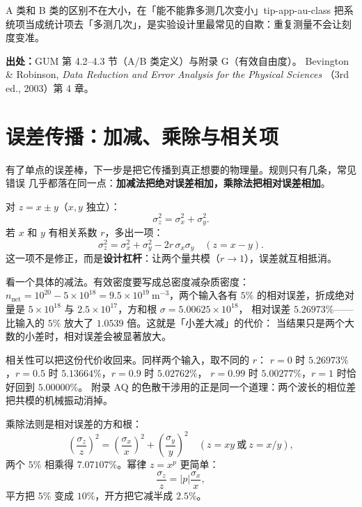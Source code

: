 \begin{tip}{A 类和 B 类的区别不在大小，在「能不能靠多测几次变小」}{tip-app-au-class}
把系统项当成统计项去「多测几次」，是实验设计里最常见的自欺：重复测量不会让刻度变准。
\end{tip}

{\small

\textbf{出处：}GUM 第 4.2--4.3 节（A/B 类定义）与附录 G（有效自由度）。
Bevington \& Robinson, \emph{Data Reduction and Error Analysis for the Physical Sciences}
（3rd ed., 2003）第 4 章。
}

\section{误差传播：加减、乘除与相关项}
\label{sec:app-au-propagate}

有了单点的误差棒，下一步是把它传播到真正想要的物理量。规则只有几条，常见错误
几乎都落在同一点：\textbf{加减法把绝对误差相加，乘除法把相对误差相加}。

对 $z=x\pm y$（$x,y$ 独立）：
\begin{equation}
\sigma_z^2=\sigma_x^2+\sigma_y^2 .
\label{eq:app-au-sum}
\end{equation}
若 $x$ 和 $y$ 有相关系数 $r$，多出一项：
\begin{equation}
\sigma_z^2=\sigma_x^2+\sigma_y^2-2r\,\sigma_x\sigma_y \quad (z=x-y).
\label{eq:app-au-corr}
\end{equation}
这一项不是修正，而是\textbf{设计杠杆}：让两个量共模（$r\to1$），误差就互相抵消。

看一个具体的减法。有效密度要写成总密度减杂质密度：$n_\mathrm{net}=10^{20}-5\times10^{18}
=9.5\times10^{19}\ \mathrm{m^{-3}}$，两个输入各有 $5\%$ 的相对误差，折成绝对量是
$5\times10^{18}$ 与 $2.5\times10^{17}$，方和根 $\sigma=5.00625\times10^{18}$，
相对误差 $5.26973\%$——比输入的 $5\%$ 放大了 $1.0539$ 倍。这就是「小差大减」的代价：
当结果只是两个大数的小差时，相对误差会被显著放大。

相关性可以把这份代价收回来。同样两个输入，取不同的 $r$：
$r=0$ 时 $5.26973\%$，$r=0.5$ 时 $5.13664\%$，$r=0.9$ 时 $5.02762\%$，
$r=0.99$ 时 $5.00277\%$，$r=1$ 时恰好回到 $5.00000\%$。
附录 AQ 的色散干涉用的正是同一个道理：两个波长的相位差把共模的机械振动消掉。

乘除法则是相对误差的方和根：
\begin{equation}
\left(\frac{\sigma_z}{z}\right)^2=\left(\frac{\sigma_x}{x}\right)^2+\left(\frac{\sigma_y}{y}\right)^2
\quad (z=xy\ \text{或}\ z=x/y),
\label{eq:app-au-prod}
\end{equation}
两个 $5\%$ 相乘得 $7.07107\%$。幂律 $z=x^p$ 更简单：
\begin{equation}
\frac{\sigma_z}{z}=\left|p\right|\frac{\sigma_x}{x},
\label{eq:app-au-power}
\end{equation}
平方把 $5\%$ 变成 $10\%$，开方把它减半成 $2.5\%$。

